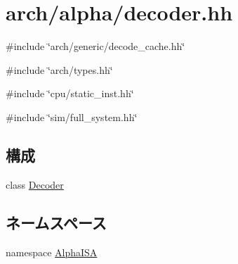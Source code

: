 \hypertarget{alpha_2decoder_8hh}{
\section{arch/alpha/decoder.hh}
\label{alpha_2decoder_8hh}
}
{\ttfamily \#include \char`\"{}arch/generic/decode\_\-cache.hh\char`\"{}}\par
{\ttfamily \#include \char`\"{}arch/types.hh\char`\"{}}\par
{\ttfamily \#include \char`\"{}cpu/static\_\-inst.hh\char`\"{}}\par
{\ttfamily \#include \char`\"{}sim/full\_\-system.hh\char`\"{}}\par
\subsection*{構成}
\begin{DoxyCompactItemize}
\item 
class \hyperlink{classAlphaISA_1_1Decoder}{Decoder}
\end{DoxyCompactItemize}
\subsection*{ネームスペース}
\begin{DoxyCompactItemize}
\item 
namespace \hyperlink{namespaceAlphaISA}{AlphaISA}
\end{DoxyCompactItemize}
